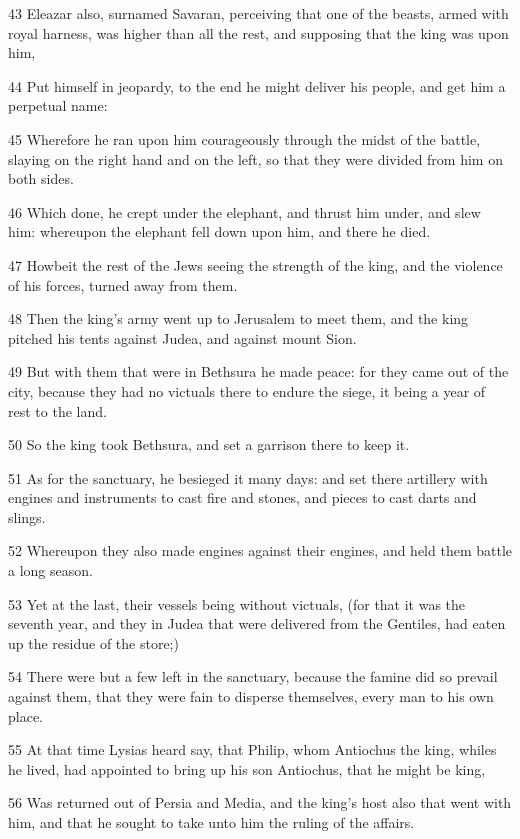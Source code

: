 \par 43 Eleazar also, surnamed Savaran, perceiving that one of the beasts, armed with royal harness, was higher than all the rest, and supposing that the king was upon him,
\par 44 Put himself in jeopardy, to the end he might deliver his people, and get him a perpetual name:
\par 45 Wherefore he ran upon him courageously through the midst of the battle, slaying on the right hand and on the left, so that they were divided from him on both sides.
\par 46 Which done, he crept under the elephant, and thrust him under, and slew him: whereupon the elephant fell down upon him, and there he died.
\par 47 Howbeit the rest of the Jews seeing the strength of the king, and the violence of his forces, turned away from them.
\par 48 Then the king's army went up to Jerusalem to meet them, and the king pitched his tents against Judea, and against mount Sion.
\par 49 But with them that were in Bethsura he made peace: for they came out of the city, because they had no victuals there to endure the siege, it being a year of rest to the land.
\par 50 So the king took Bethsura, and set a garrison there to keep it.
\par 51 As for the sanctuary, he besieged it many days: and set there artillery with engines and instruments to cast fire and stones, and pieces to cast darts and slings.
\par 52 Whereupon they also made engines against their engines, and held them battle a long season.
\par 53 Yet at the last, their vessels being without victuals, (for that it was the seventh year, and they in Judea that were delivered from the Gentiles, had eaten up the residue of the store;)
\par 54 There were but a few left in the sanctuary, because the famine did so prevail against them, that they were fain to disperse themselves, every man to his own place.
\par 55 At that time Lysias heard say, that Philip, whom Antiochus the king, whiles he lived, had appointed to bring up his son Antiochus, that he might be king,
\par 56 Was returned out of Persia and Media, and the king's host also that went with him, and that he sought to take unto him the ruling of the affairs.
